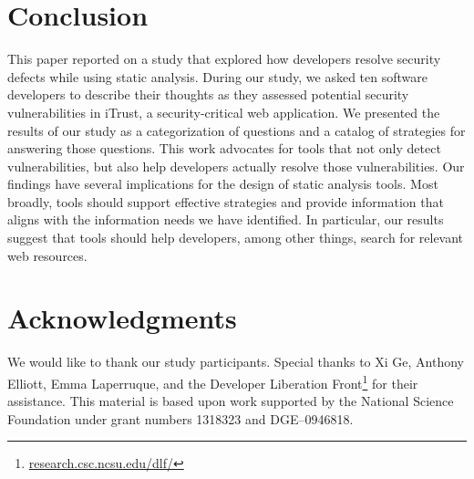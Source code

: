 \documentclass[10pt,journal,compsoc]{IEEEtran}
\newcommand{\blind}[1]{#1}
\begin{document}
\section{Conclusion}
\label{sec:concl}
This paper reported on a study that explored how developers resolve security defects while using static analysis.
During our study, we asked ten software developers to describe their thoughts as they assessed potential security vulnerabilities in iTrust, a security-critical web application.
We presented the results of our study as a categorization of questions and a catalog of strategies for answering those questions.
This work advocates for tools that not only detect vulnerabilities, but also help developers actually resolve those vulnerabilities.
Our findings have several implications for the design of static analysis tools.
Most broadly, tools should support effective strategies and provide information that aligns with the information needs we have identified.
In particular, our results suggest that tools should help developers, among other things, search for relevant web resources.


\section*{Acknowledgments}

We would like to thank our study participants. 
Special thanks to Xi Ge, Anthony Elliott, Emma Laperruque, and the Developer Liberation Front\footnote{\blind{\url{research.csc.ncsu.edu/dlf/}}} for their assistance. 
This material is based upon work supported by the National Science Foundation under grant numbers 1318323 and DGE--0946818.



%
\end{document}
